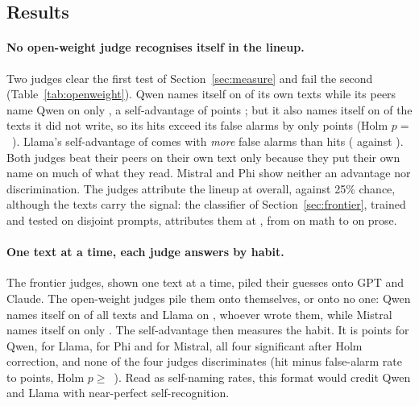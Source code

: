 \subsection{Results}


\paragraph{No open-weight judge recognises itself in the lineup.} Two
judges clear the first test of Section~\ref{sec:measure} and fail the
second (Table~\ref{tab:openweight}). Qwen names itself on
\OWQwenLineupSelf{} of its own texts while its peers name Qwen on only
\OWQwenLineupPeer{}, a self-advantage of \OWQwenLineupAdv{} points
\OWQwenLineupAdvCI{}; but it also names itself on \OWQwenLineupFA{} of the
texts it did not write, so its hits exceed its false alarms by only
\OWQwenLineupDisc{} points (Holm $p=$~\OWQwenLineupDiscHolm{}). Llama's
self-advantage of \OWLlamaLineupAdv{} \OWLlamaLineupAdvCI{} comes with
\emph{more} false alarms than hits (\OWLlamaLineupFA{} against
\OWLlamaLineupSelf{}). Both judges beat their peers on their own text only
because they put their own name on much of what they read. Mistral and Phi show neither
an advantage nor discrimination. The judges attribute the lineup at
\OWLineupAcc{} overall, against 25\% chance, although the texts carry the
signal: the classifier of Section~\ref{sec:frontier}, trained and tested on
disjoint prompts, attributes them at \OWClfPooled{} \OWClfPooledCI{}, from
\OWClfMath{} on math to \OWClfProse{} on prose.

\paragraph{One text at a time, each judge answers by habit.} The frontier
judges, shown one text at a time, piled their guesses onto GPT and Claude.
The open-weight judges pile them onto themselves, or onto no one: Qwen names
itself on \OWQwenSingleNamesSelf{} of all texts and Llama on
\OWLlamaSingleNamesSelf{}, whoever wrote them, while Mistral names itself on
only \OWMistralSingleNamesSelf{}. The self-advantage then measures the habit.
It is \OWQwenSingleAdv{} points for Qwen, \OWLlamaSingleAdv{} for Llama,
\OWPhiSingleAdv{} for Phi and \OWMistralSingleAdv{} for Mistral, all four
significant after Holm correction, and none of the four judges
discriminates (hit minus false-alarm rate \OWLlamaSingleDisc{} to
\OWPhiSingleDisc{} points, Holm $p\geq$~\OWPhiSingleDiscHolm{}). Read as
self-naming rates, this format would credit Qwen and Llama with near-perfect
self-recognition.

